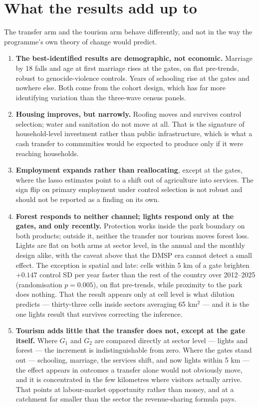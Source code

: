 \documentclass[11pt]{article}
\begin{document}
\section{What the results add up to}

The transfer arm and the tourism arm behave differently, and not in the way the programme's own
theory of change would predict.

\begin{enumerate}\itemsep3pt
\item \textbf{The best-identified results are demographic, not economic.} Marriage by 18 falls and
age at first marriage rises at the gates, on flat pre-trends, robust to genocide-violence controls.
Years of schooling rise at the gates and nowhere else. Both come from the cohort design, which has
far more identifying variation than the three-wave census panels.
\item \textbf{Housing improves, but narrowly.} Roofing moves and survives control selection; water and
sanitation do not move at all. That is the signature of household-level investment rather than public
infrastructure, which is what a cash transfer to communities would be expected to produce only if it
were reaching households.
\item \textbf{Employment expands rather than reallocating}, except at the gates, where the lasso
estimates point to a shift out of agriculture into services. The sign flip on primary employment
under control selection is not robust and should not be reported as a finding on its own.
\item \textbf{Forest responds to neither channel; lights respond only at the gates, and only
recently.} Protection works inside the park boundary on both products; outside it, neither the
transfer nor tourism moves forest loss. Lights are flat on both arms at sector level, in the annual
and the monthly design alike, with the caveat above that the DMSP era cannot detect a small effect.
The exception is spatial and late: cells within 5 km of a gate brighten $+0.147$ control SD per year
faster than the rest of the country over 2012--2025 (randomisation $p=0.005$), on flat pre-trends,
while proximity to the park does nothing. That the result appears only at cell level is what dilution
predicts --- thirty-three cells inside sectors averaging 65 km$^2$ --- and it is the one lights result
that survives correcting the inference.
\item \textbf{Tourism adds little that the transfer does not, except at the gate itself.} Where
$G_1$ and $G_2$ are compared directly at sector level --- lights and forest --- the increment is
indistinguishable from zero. Where the gates stand out --- schooling, marriage, the services shift,
and now lights within 5 km --- the effect appears in outcomes a transfer alone would not obviously
move, and it is concentrated in the few kilometres where visitors actually arrive. That points at
labour-market opportunity rather than money, and at a catchment far smaller than the sector the
revenue-sharing formula pays.
\end{enumerate}
\end{document}
